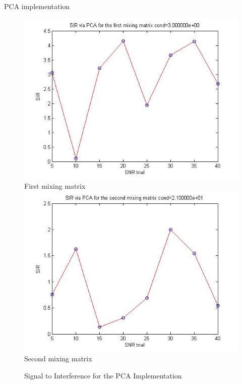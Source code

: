 \documentclass[t,12pt,english
\ifx\beamermode\undefined\else,\beamermode\fi
]{beamer}
\begin{document}
\begin{frame}{PCA implementation}

\begin{figure}[!htbp]
%
\centering
\includegraphics[width=1\textwidth]{3.jpg}\\
\tiny{First mixing matrix}\label{a3}
\endminipage\hfill
{}%
\centering
\includegraphics[width=1\textwidth]{4.jpg}\\
\tiny{Second mixing matrix}\label{a4}
\endminipage\hfill
\caption{\tiny Signal to Interference for the PCA Implementation}
\end{figure}

    
\end{frame}
\end{document}

